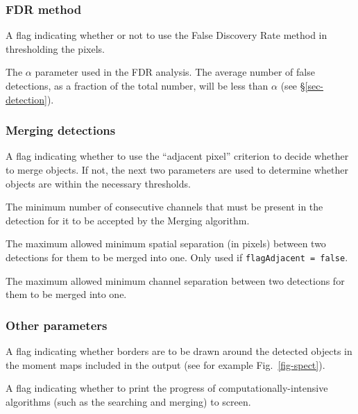 \documentclass[12pt]{article}
\newcommand{\entrylabel}[1]{\mbox{\textsf{\bf{#1:}}}\hfil}
\newenvironment{entry}
        {\begin{list}{}%
                {\renewcommand{\makelabel}{\entrylabel}%
                        \setlength{\labelwidth}{30mm}%
                        \setlength{\labelsep}{5pt}%
                        \setlength{\itemsep}{2pt}%
                        \setlength{\parsep}{2pt}%
                        \setlength{\leftmargin}{35mm}%
                }%
        }%
{\end{list}}
\begin{document}
\subsubsection*{FDR method}
\begin{entry}
\item[flagFDR {\tt [false]}] A flag indicating whether or not to use
  the False Discovery Rate method in thresholding the pixels.
\item[alphaFDR {\tt [0.01]}] The $\alpha$ parameter used in the FDR
analysis. The average number of false detections, as a fraction of the
total number, will be less than $\alpha$ (see \S\ref{sec-detection}).
\end{entry}

\subsubsection*{Merging detections}
\begin{entry}
\item[flagAdjacent {\tt [true]}] A flag indicating whether to use the
  ``adjacent pixel'' criterion to decide whether to merge objects. If
  not, the next two parameters are used to determine whether objects
  are within the necessary thresholds.
\item[minChannels {\tt [3]}] The minimum number of consecutive
  channels that must be present in the detection for it to be accepted
  by the Merging algorithm.
\item[threshSpatial {\tt [3.]}] The maximum allowed minimum spatial
  separation (in pixels) between two detections for them to be merged
  into one. Only used if {\tt flagAdjacent = false}.
\item[threshVelocity {\tt [7.]}] The maximum allowed minimum channel
  separation between two detections for them to be merged into
  one. %
\end{entry}

\subsubsection*{Other parameters}
\begin{entry}
\item[drawBorders {\tt [true]}] A flag indicating whether borders
  are to be drawn around the detected objects in the moment maps
  included in the output (see for example Fig.~\ref{fig-spect}).
\item[verbose {\tt [true]}] A flag indicating whether to print the
  progress of computationally-intensive algorithms (such as the
  searching and merging) to screen.
\end{entry}
\end{document}
